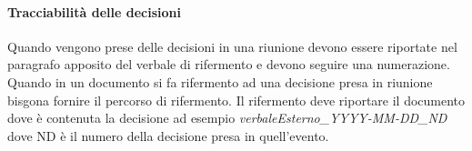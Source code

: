     \paragraph{Tracciabilità delle decisioni}
      Quando vengono prese delle decisioni in una riunione devono essere
      riportate nel paragrafo apposito del verbale di rifermento e devono
      seguire una numerazione.
      Quando in un documento si fa rifermento ad una decisione presa in riunione
      bisgona fornire il percorso di rifermento.
      Il rifermento deve riportare il documento dove è contenuta la decisione
      ad esempio \textit{verbaleEsterno\_YYYY-MM-DD\_ND} dove ND è il numero della
      decisione presa in quell'evento.
